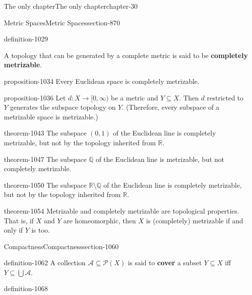 \documentclass[oneside,10pt,]{book}
\newcommand{\terminology}[1]{\textbf{#1}}
\newcommand{\mb}{\mathbb}
\newcommand{\mc}{\mathcal}
\begin{document}
\begin{chapterptx}{The only chapter}{}{The only chapter}{}{}{chapter-30}
\begin{sectionptx}{Metric Spaces}{}{Metric Spaces}{}{}{section-870}
\begin{definition}{}{definition-1029}
\par
\hypertarget{p-1032}{}%
A topology that can be generated by a complete metric is said to be \terminology{completely metrizable}.%
\end{definition}
\begin{proposition}{}{}{proposition-1034}%
\hypertarget{p-1035}{}%
Every Euclidean space is completely metrizable.%
\end{proposition}
\begin{proposition}{}{}{proposition-1036}%
\hypertarget{p-1037}{}%
Let \(d:X\to[0,\infty)\) be a metric and \(Y\subseteq X\). Then \(d\) restricted to \(Y\) generates the subspace topology on \(Y\). (Therefore, every subspace of a metrizable space is metrizable.)%
\end{proposition}
\begin{theorem}{}{}{theorem-1043}%
\hypertarget{p-1044}{}%
The subspace \((0,1)\) of the Euclidean line is completely metrizable, but not by the topology inherited from \(\mb R\).%
\end{theorem}
\begin{theorem}{}{}{theorem-1047}%
\hypertarget{p-1048}{}%
The subspace \(\mb Q\) of the Euclidean line is metrizable, but not completely metrizable.%
\end{theorem}
\begin{theorem}{}{}{theorem-1050}%
\hypertarget{p-1051}{}%
The subspace \(\mb R\setminus\mb Q\) of the Euclidean line is completely metrizable, but not by the topology inherited from \(\mb R\).%
\end{theorem}
\begin{theorem}{}{}{theorem-1054}%
\hypertarget{p-1055}{}%
Metrizable and completely metrizable are topological properties. That is, if \(X\) and \(Y\) are homeomorphic, then \(X\) is (completely) metrizable if and only if \(Y\) is too.%
\end{theorem}
\end{sectionptx}
%
%
\typeout{************************************************}
\typeout{************************************************}
%
\begin{sectionptx}{Compactness}{}{Compactness}{}{}{section-1060}
\begin{definition}{}{definition-1062}%
\hypertarget{p-1063}{}%
A collection \(\mc A\subseteq \mc P(X)\) is said to \terminology{cover} a subset \(Y\subseteq X\) iff \(Y\subseteq\bigcup\mc A\).%
\end{definition}
\begin{definition}{}{definition-1068}%

\end{definition}
\end{sectionptx}
\end{chapterptx}
\end{document}
